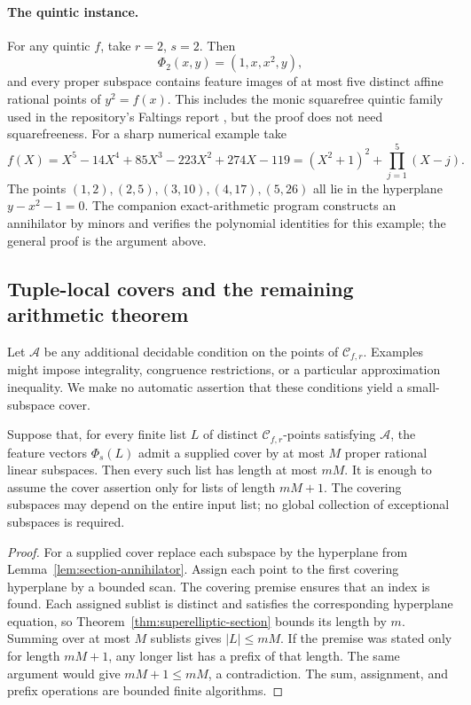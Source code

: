 \paragraph{The quintic instance.}
For any quintic $f$, take $r=2$, $s=2$. Then
\[
                  \Phi_2(x,y)=(1,x,x^2,y),
\]
and every proper subspace contains feature images of at most five
distinct affine rational points of $y^2=f(x)$. This includes the
monic squarefree quintic family used in the repository's Faltings
report \cite{repo-faltings}, but the proof does not need squarefreeness.
For a sharp numerical example take
\[
 f(X)=X^5-14X^4+85X^3-223X^2+274X-119
      =(X^2+1)^2+\prod_{j=1}^{5}(X-j).
\]
The points $(1,2),(2,5),(3,10),(4,17),(5,26)$ all lie in the
hyperplane $y-x^2-1=0$. The companion exact-arithmetic program
constructs an annihilator by minors and verifies the polynomial
identities for this example; the general proof is the argument above.

\subsection{Tuple-local covers and the remaining arithmetic theorem}

Let $\mathcal A$ be any additional decidable condition on the
points of $\mathcal C_{f,r}$. Examples might impose integrality,
congruence restrictions, or a particular approximation inequality.
We make no automatic assertion that these conditions yield a
small-subspace cover.

\begin{theorem}
\label{thm:superelliptic-cover}
Suppose that, for every finite list $L$ of distinct
$\mathcal C_{f,r}$-points satisfying $\mathcal A$, the feature
vectors $\Phi_s(L)$ admit a supplied cover by at most $M$ proper
rational linear subspaces. Then every such list has length at most
$mM$. It is enough to assume the cover assertion only for lists
of length $mM+1$. The covering subspaces may depend on the entire
input list; no global collection of exceptional subspaces is required.
\end{theorem}
\begin{proof}
For a supplied cover replace each subspace by the hyperplane from
Lemma~\ref{lem:section-annihilator}. Assign each point to the first
covering hyperplane by a bounded scan. The covering premise ensures
that an index is found. Each assigned sublist is distinct and
satisfies the corresponding hyperplane equation, so
Theorem~\ref{thm:superelliptic-section} bounds its length by $m$.
Summing over at most $M$ sublists gives $|L|\le mM$.
If the premise was stated only for length $mM+1$, any longer list
has a prefix of that length. The same argument would give
$mM+1\le mM$, a contradiction. The sum, assignment, and prefix
operations are bounded finite algorithms.
\end{proof}


